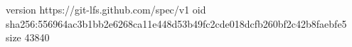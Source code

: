 version https://git-lfs.github.com/spec/v1
oid sha256:556964ac3b1bb2e6268ca11e448d53b49fc2cde018dcfb260bf2c42b8faebfe5
size 43840
